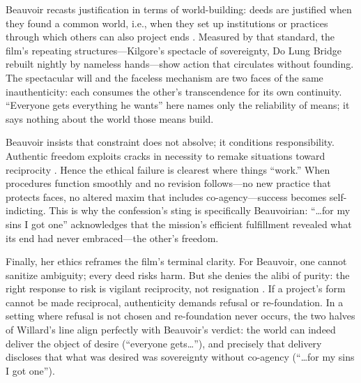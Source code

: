 Beauvoir recasts justification in terms of world-building: deeds are justified when they found
a common world, i.e., when they set up institutions or practices through which others can also
project ends \parencite[pp.~145--153]{Beauvoir1976}. Measured by that standard, the film's
repeating structures—Kilgore's spectacle of sovereignty, Do Lung Bridge rebuilt nightly by
nameless hands—show action that circulates without founding. The spectacular will and the
faceless mechanism are two faces of the same inauthenticity: each consumes the other's
transcendence for its own continuity. ``Everyone gets everything he wants'' here names only the
reliability of means; it says nothing about the world those means build.

Beauvoir insists that constraint does not absolve; it conditions responsibility. Authentic
freedom exploits cracks in necessity to remake situations toward reciprocity
\parencite[pp.~34--42]{Beauvoir1976}. Hence the ethical failure is clearest where things
``work.'' When procedures function smoothly and no revision follows—no new practice that
protects faces, no altered maxim that includes co-agency—success becomes self-indicting. This is
why the confession's sting is specifically Beauvoirian: ``\ldots for my sins I got one''
acknowledges that the mission's efficient fulfillment revealed what its end had never
embraced—the other's freedom.

Finally, her ethics reframes the film's terminal clarity. For Beauvoir, one cannot sanitize
ambiguity; every deed risks harm. But she denies the alibi of purity: the right response to risk
is vigilant reciprocity, not resignation \parencite[pp.~139--147]{Beauvoir1976}. If a project's
form cannot be made reciprocal, authenticity demands refusal or re-foundation. In a setting
where refusal is not chosen and re-foundation never occurs, the two halves of Willard's line
align perfectly with Beauvoir's verdict: the world can indeed deliver the object of desire
(``everyone gets\ldots''), and precisely that delivery discloses that what was desired was
sovereignty without co-agency (``\ldots for my sins I got one'').
